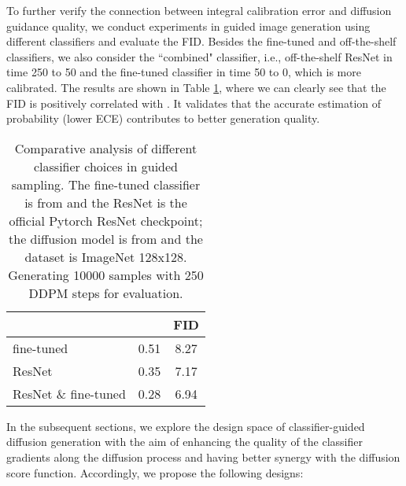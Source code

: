 \documentclass{article}
\theoremstyle{definition}
\begin{document}
To further verify the connection between integral calibration error and diffusion guidance quality, we conduct experiments in guided image generation using different classifiers and evaluate the FID. 
Besides the fine-tuned and off-the-shelf classifiers, we also consider the ``combined" classifier, i.e., off-the-shelf ResNet in time 250 to 50 and the fine-tuned classifier in time 50 to 0, which is more calibrated. 
The results are shown in Table \ref{table:compare_calibration_model}, where we can clearly see that the FID is positively correlated with . 
It validates that the accurate estimation of probability (lower ECE) contributes to better generation quality. 





\begin{table}[h!]
\caption{Comparative analysis of different classifier choices in guided sampling. The fine-tuned classifier is from \cite{dhariwal2021diffusion} and the ResNet is the official Pytorch ResNet checkpoint; the diffusion model is from \cite{dhariwal2021diffusion} and the dataset is ImageNet 128x128. Generating 10000 samples with 250 DDPM steps for evaluation.}
\label{table:compare_calibration_model}
\begin{center}
\begin{small}
\begin{sc}

\begin{tabular}{lcc}
\toprule
   &  & FID \\
\midrule
fine-tuned                 &  0.51 &  8.27 \\
ResNet                     &  0.35 &  7.17\\
ResNet \& fine-tuned         &  0.28 &  6.94\\

\bottomrule
\end{tabular}
\end{sc}
\end{small}
\end{center}
\end{table}

In the subsequent sections, we explore the design space of classifier-guided diffusion generation with the aim of enhancing the quality of the classifier gradients along the diffusion process and having better synergy with the diffusion score function. Accordingly, we propose the following designs:
\end{document}
